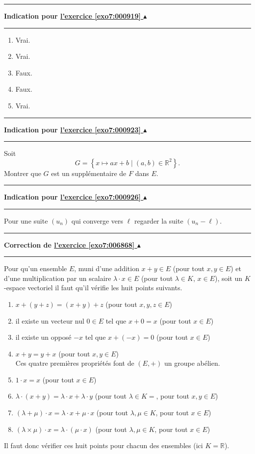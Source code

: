 \documentclass[11pt,a4paper]{article}
\newcommand{\Rr}{\mathbb{R}} \newcommand{\R}{\mathbb{R}}
\newcounter{exo}
\newcommand{\indication}[1]{\hypertarget{ind7:#1}{}\label{ind7:#1}{\bf Indication pour \hyperlink{exo7:#1}{l'exercice \ref{exo7:#1} $\blacktriangle$}}\vspace{1mm}\hrule\vspace{1mm}}
\newcommand{\finindication}{\vspace{1mm}\hrule\vspace*{7mm}}
\newcommand{\correction}[1]{\hypertarget{cor7:#1}{}\label{cor7:#1}{\bf Correction de \hyperlink{exo7:#1}{l'exercice \ref{exo7:#1} $\blacktriangle$}}\vspace{1mm}\hrule\vspace{1mm}}
\begin{document}
\finindication
\indication{000919}
\begin{enumerate}
\item Vrai.
\item Vrai.
\item Faux.
\item Faux.
\item Vrai.
\end{enumerate}
\finindication
\indication{000923}
  Soit
  $$G= \left\lbrace x \mapsto ax+b \mid (a,b) \in \Rr^2 \right\rbrace.$$
  Montrer que $G$ est un suppl\'ementaire de $F$ dans $E$.
\finindication
\indication{000926}
Pour une suite $(u_n)$ qui converge vers $\ell$ regarder la suite $(u_n-\ell)$.
\finindication


\newpage

\correction{006868}
Pour qu'un ensemble $E$, muni d'une addition $x+y \in E$ (pour tout $x,y \in E$)
et d'une multiplication par un scalaire $\lambda \cdot x \in E$ (pour tout $\lambda \in K$, $x\in E$),
soit un $K$-espace vectoriel il faut qu'il vérifie les huit points suivants.

\begin{enumerate}
  \item $x+(y+z)=(x+y)+z$ (pour tout $x,y,z \in E$)
  \item il existe un vecteur nul $0 \in E$ tel que $x+0=x$ (pour tout $x\in E$)
  \item il existe un opposé $-x$ tel que $x+(-x)=0$ (pour tout $x\in E$)
  \item $x+y=y+x$ (pour tout $x,y \in E$) \\
Ces quatre premières propriétés font de $(E,+)$ un groupe abélien.

  \item $1\cdot x = x$ (pour tout $x\in E$)
  \item $\lambda \cdot (x+y) = \lambda\cdot x + \lambda \cdot y$ (pour tout $\lambda \in K=$, pour tout $x,y \in E$)
  \item $(\lambda+\mu) \cdot x = \lambda\cdot x+ \mu \cdot x$ (pour tout $\lambda, \mu \in K$, pour tout $x \in E$)
  \item $(\lambda\times\mu) \cdot x = \lambda\cdot (\mu\cdot x)$ (pour tout $\lambda, \mu \in K$, pour tout $x \in E$)
\end{enumerate}


Il faut donc vérifier ces huit points pour chacun des ensembles (ici $K=\Rr$).
\end{document}
